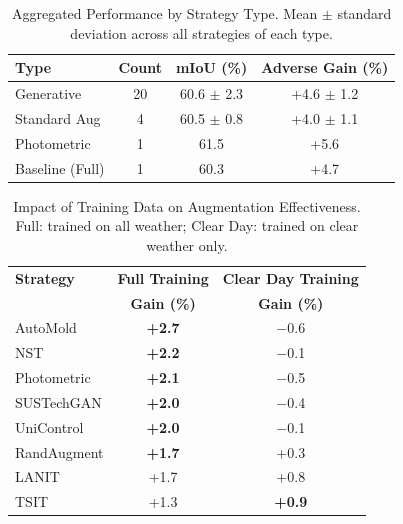 
\begin{table}[t]
\centering
\caption{Aggregated Performance by Strategy Type. Mean $\pm$ standard deviation across all strategies of each type.}
\label{tab:strategy_type_summary}
\begin{tabular}{@{}lccc@{}}
\toprule
\textbf{Type} & \textbf{Count} & \textbf{mIoU (\%)} & \textbf{Adverse Gain (\%)} \\
\midrule
Generative & 20 & 60.6 $\pm$ 2.3 & +4.6 $\pm$ 1.2 \\
Standard Aug & 4 & 60.5 $\pm$ 0.8 & +4.0 $\pm$ 1.1 \\
Photometric & 1 & 61.5 & +5.6 \\
Baseline (Full) & 1 & 60.3 & +4.7 \\
\bottomrule
\end{tabular}
\end{table}



\begin{table}[t]
\centering
\caption{Impact of Training Data on Augmentation Effectiveness. Full: trained on all weather; Clear Day: trained on clear weather only.}
\label{tab:training_comparison}
\begin{tabular}{@{}lcc@{}}
\toprule
\textbf{Strategy} & \textbf{Full Training} & \textbf{Clear Day Training} \\
 & \textbf{Gain (\%)} & \textbf{Gain (\%)} \\
\midrule
AutoMold & \textbf{+2.7} & $-$0.6 \\
NST & \textbf{+2.2} & $-$0.1 \\
Photometric & \textbf{+2.1} & $-$0.5 \\
SUSTechGAN & \textbf{+2.0} & $-$0.4 \\
UniControl & \textbf{+2.0} & $-$0.1 \\
RandAugment & \textbf{+1.7} & +0.3 \\
LANIT & +1.7 & +0.8 \\
TSIT & +1.3 & \textbf{+0.9} \\
\bottomrule
\end{tabular}
\end{table}


